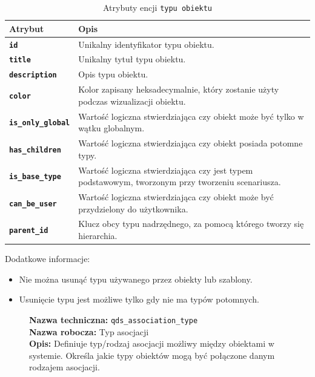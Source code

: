\begin{table}[H]
    \centering
    \renewcommand{\arraystretch}{1.6}
    \begin{tabular}{|>{\bfseries}l|p{}|}
        \hline
        \rowcolor[HTML]{EFEFEF} \textbf{Atrybut} & \textbf{Opis} \\
        \hline
        \texttt{id} & Unikalny identyfikator typu obiektu. \\
        \hline
        \texttt{title} & Unikalny tytuł typu obiektu. \\
        \hline
        \texttt{description} & Opis typu obiektu. \\
        \hline
        \texttt{color} & Kolor zapisany heksadecymalnie, który zostanie użyty podczas wizualizacji obiektu. \\
        \hline
        \texttt{is\_only\_global} & Wartość logiczna stwierdziająca czy obiekt może być tylko w wątku globalnym. \\
        \hline
        \texttt{has\_children} & Wartość logiczna stwierdziająca czy obiekt posiada potomne typy. \\
        \hline
        \texttt{is\_base\_type} & Wartość logiczna stwierdziająca czy jest typem podstawowym, tworzonym przy tworzeniu scenariusza. \\
        \hline
        \texttt{can\_be\_user} & Wartość logiczna stwierdziająca czy obiekt może być przydzielony do użytkownika. \\
        \hline
        \texttt{parent\_id} & Klucz obcy typu nadrzędnego, za pomocą którego tworzy się hierarchia. \\
        \hline
    \end{tabular}
    \caption{Atrybuty encji \texttt{typu obiektu}}
\end{table}

Dodatkowe informacje:
\begin{itemize}
    \item Nie można usunąć typu używanego przez obiekty lub szablony.
    \item Usunięcie typu jest możliwe tylko gdy nie ma typów potomnych.
\end{itemize}

\begin{figure}[H]
    \centering
    \begin{minipage}{0.8\textwidth}
        \begin{framed}
            \noindent\textbf{\large Nazwa techniczna:} \texttt{qds\_association\_type} \\
            \textbf{\large Nazwa robocza:} Typ asocjacji \\
            \textbf{\large Opis:} Definiuje typ/rodzaj asocjacji możliwy między obiektami w systemie.
            Określa jakie typy obiektów mogą być połączone danym rodzajem asocjacji.
        \end{framed}
    \end{minipage}
\end{figure}

